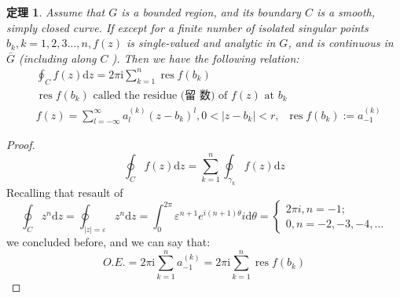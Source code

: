 \documentclass[10pt, a4paper, oneside]{ctexbook}
\newtheorem{theorem}{定理}[section]
\def\D{\mathrm{d}}
\begin{document}
\begin{theorem}
    Assume that $G$ is a bounded region, and its boundary $C$ is a smooth, simply closed curve. If except for a finite number of isolated singular points $b_{k}, k=1,2,3 \ldots, n, f(z)$ is single-valued and analytic in $G$, and is continuous in $\bar{G}$ (including along $C$ ). Then we have the following relation:
    \begin{align*}
        &\oint_{C} f(z) \D z=2 \pi \mathrm{i} \sum_{k=1}^{n} \operatorname{res} f\left(b_{k}\right) \\
        & \operatorname{res} f\left(b_{k}\right) \text { called the residue (留 数) of } f(z) \text { at } b_{k} \\
        & f(z)=\sum_{l=-\infty}^{\infty} a_{l}^{(k)}\left(z-b_{k}\right)^{l}, 0<\left|z-b_{k}\right|<r,\;\; \operatorname{res} f(b_k) := a_{-1}^{(k)}
    \end{align*}
\end{theorem}
\begin{proof}
    \begin{equation*}
        \oint_{C} f(z) \D z=\sum_{k=1}^{n} \oint_{\gamma_{k}} f(z) \D z
    \end{equation*}
    Recalling that resault of
    \begin{equation*}
        \oint_{C} z^{n} \D z=\oint_{|z|=\varepsilon} z^{n} \D z=\int_{0}^{2 \pi} \varepsilon^{n+1} e^{i(n+1) \theta} i \D \theta=\left\{\begin{array}{l}
        2 \pi i, n=-1 ; \\
        0, n=-2,-3,-4, \ldots
    \end{array}\right.
\end{equation*}
    we concluded before, and we can say that:
    \begin{equation*}
       O.E. =  2 \pi \mathrm{i} \sum_{k=1}^{n} a_{-1}^{(k)}=2 \pi \mathrm{i} \sum_{k=1}^{n} \operatorname{res} f\left(b_{k}\right)
    \end{equation*}
\end{proof}
\end{document}
